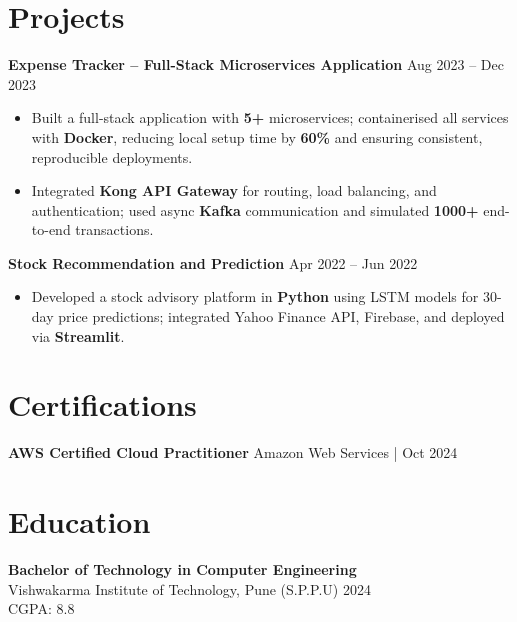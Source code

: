 \documentclass[a4paper,10pt]{article}
\begin{document}
\section*{Projects}

\textbf{Expense Tracker -- Full-Stack Microservices Application} \hfill Aug 2023 -- Dec 2023
\begin{itemize}[leftmargin=*]
    \item Built a full-stack application with \textbf{5+} microservices; containerised all services with \textbf{Docker}, reducing local setup time by \textbf{60\%} and ensuring consistent, reproducible deployments.
    \item Integrated \textbf{Kong API Gateway} for routing, load balancing, and authentication; used async \textbf{Kafka} communication and simulated \textbf{1000+} end-to-end transactions.
\end{itemize}
\textbf{Stock Recommendation and Prediction} \hfill Apr 2022 -- Jun 2022
\begin{itemize}[leftmargin=*]
    \item Developed a stock advisory platform in \textbf{Python} using LSTM models for 30-day price predictions; integrated Yahoo Finance API, Firebase, and deployed via \textbf{Streamlit}.
\end{itemize}

\section*{Certifications}
\textbf{AWS Certified Cloud Practitioner} \hfill Amazon Web Services \;|\; Oct 2024 \\

\section*{Education}

\textbf{Bachelor of Technology in Computer Engineering} \\
Vishwakarma Institute of Technology, Pune (S.P.P.U) \hfill 2024 \\
CGPA: 8.8
\end{document}

